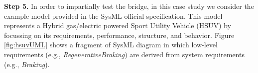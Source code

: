 \textbf{Step 5.} In order to impartially test the bridge, in this case study we consider the example model provided in the SysML official specification.
This model represents a Hybrid gas/electric powered Sport Utility Vehicle (HSUV) by focussing on its requirements, performance, structure, and behavior. 
Figure \ref{fig:hsuvUML} shows a fragment of SysML diagram in which low-level requirements
(e.g., \textit{RegenerativeBraking})
are derived from system requirements (e.g., \textit{Braking}). 
%
\vspace{-.4cm}
\begin{figure}
  \centering
 \hspace{2mm}

\end{figure}
